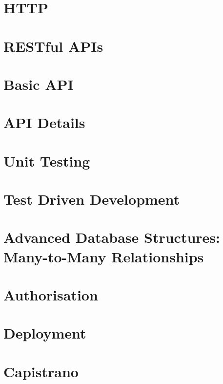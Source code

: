 \documentclass[b5paper,openany]{book}
\begin{document}
\tp


\tableofcontents



\chapter{HTTP}


\chapter{RESTful APIs}


\chapter{Basic API}


\chapter{API Details}


\chapter{Unit Testing}


\chapter{Test Driven Development}


\chapter{Advanced Database Structures: Many-to-Many Relationships}


\chapter{Authorisation}


\chapter{Deployment}


\chapter{Capistrano}






\end{document}
